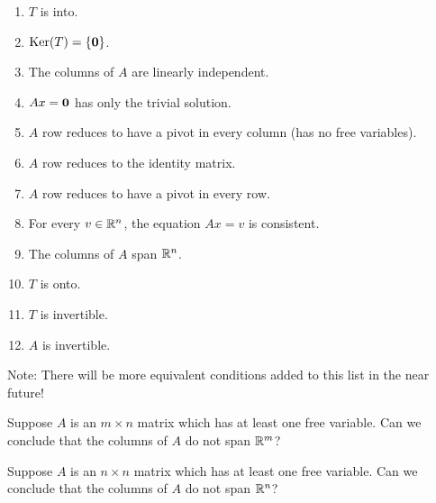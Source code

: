 \begin{enumerate}
\item $T$ is into.
\item $\mathrm{Ker}(T) = \{ \mathbf{0} \}$.  
\item The columns of $A$ are linearly independent. 
\item $Ax = \mathbf{0}$ has only the trivial solution.
\item $A$ row reduces to have a pivot in every column (has no free variables).  
\item $A$ row reduces to the identity matrix.  
\item $A$ row reduces to have a pivot in every row.  
\item For every $v\in \mathbb R^n$, the equation $Ax = v$ is consistent.
\item The columns of $A$ span $\mathbb R^n$.  
\item $T$ is onto.  
\item $T$ is invertible.
\item $A$ is invertible.

\end{enumerate}

Note: There will be more equivalent conditions added to this list in the near future!  


\endedxtext




Suppose $A$ is an $m\times n$ matrix which has at least one free variable.  Can we conclude that the columns of 
$A$ do not span $\mathbb R^m$?  


Suppose $A$ is an $n\times n$ matrix which has at least one free variable. Can we conclude that the columns of $A$ do not span $\mathbb R^n$?  


\endedxproblem



